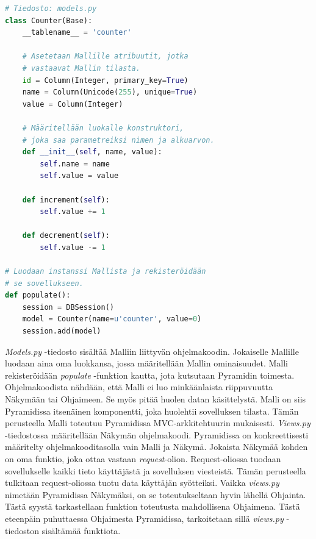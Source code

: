 \documentclass[utf8]{gradu3}
\begin{document}
\lstset{numbers=left}
\begin{lstlisting}[language=Python]
# Tiedosto: models.py
class Counter(Base):
    __tablename__ = 'counter'

    # Asetetaan Mallille atribuutit, jotka
    # vastaavat Mallin tilasta.
    id = Column(Integer, primary_key=True)
    name = Column(Unicode(255), unique=True)
    value = Column(Integer)

    # Määritellään luokalle konstruktori,
    # joka saa parametreiksi nimen ja alkuarvon.
    def __init__(self, name, value):
        self.name = name
        self.value = value

    def increment(self):
        self.value += 1

    def decrement(self):
        self.value -= 1

# Luodaan instanssi Mallista ja rekisteröidään 
# se sovellukseen.
def populate():
    session = DBSession()
    model = Counter(name=u'counter', value=0)
    session.add(model)
\end{lstlisting}
\emph{Models.py} -tiedosto sisältää Malliin liittyvän ohjelmakoodin. Jokaiselle Mallille luodaan aina oma luokkansa, jossa määritellään Mallin ominaisuudet. Malli rekisteröidään \emph{populate} -funktion kautta, jota kutsutaan Pyramidin toimesta.
Ohjelmakoodista nähdään, että Malli ei luo minkäänlaista riippuvuutta Näkymään tai Ohjaimeen. Se myös pitää huolen datan käsittelystä.  Malli on siis Pyramidissa itsenäinen komponentti, joka huolehtii sovelluksen tilasta. Tämän perusteella Malli toteutuu Pyramidissa MVC-arkkitehtuurin mukaisesti.
\emph{Views.py} -tiedostossa määritellään Näkymän ohjelmakoodi. Pyramidissa on konkreettisesti määritelty ohjelmakooditasolla vain Malli ja Näkymä.
Jokaista Näkymää kohden on oma funktio, joka ottaa vastaan \emph{request}-olion. Request-oliossa tuodaan sovellukselle kaikki tieto käyttäjästä ja sovelluksen viesteistä. Tämän perusteella tulkitaan request-oliossa tuotu data käyttäjän syötteiksi.
Vaikka \emph{views.py} nimetään Pyramidissa Näkymäksi, on se toteutukseltaan hyvin lähellä Ohjainta. Tästä syystä tarkastellaan funktion toteutusta mahdollisena Ohjaimena. Tästä eteenpäin puhuttaessa Ohjaimesta Pyramidissa, tarkoitetaan sillä \emph{views.py} -tiedoston sisältämää funktiota.
\end{document}
